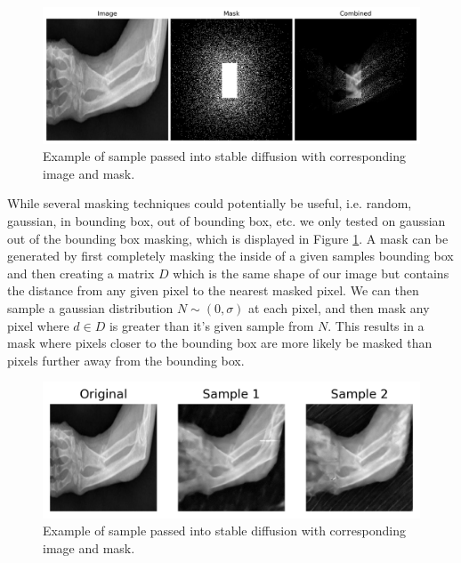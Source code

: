 \documentclass{article}
\begin{document}
\begin{figure}[ht]
    \vskip -0.1in
    \begin{center}
        \centerline{\includegraphics[width=\columnwidth]{Mask.png}}
        \caption{Example of sample passed into stable diffusion with corresponding image and mask.}
        \label{psld_mask}
    \end{center}
    \vskip -0.3in
\end{figure}

While several masking techniques could potentially be useful, i.e. random, gaussian, in bounding box, out of bounding box, etc. we only tested on
gaussian out of the bounding box masking, which is displayed in Figure \ref{psld_mask}. A mask can be generated by first completely masking the inside 
of a given samples bounding box and then creating 
a matrix $D$ which is the same shape of our image but contains the distance from any given pixel to the nearest masked pixel. We can then sample a gaussian
distribution $N \sim (0, \sigma)$ at each pixel, and then mask any pixel where $d \in D$ is greater than it's given sample from $N$. This results in a mask where pixels
closer to the bounding box are more likely be masked than pixels further away from the bounding box. 

\begin{figure}[ht]
    \vskip -0.1in
    \begin{center}
        \centerline{\includegraphics[width=\columnwidth]{psld_results.png}}
        \caption{Example of sample passed into stable diffusion with corresponding image and mask.}
        \label{psld_results}
    \end{center}
    \vskip -0.3in
\end{figure}
\end{document}
